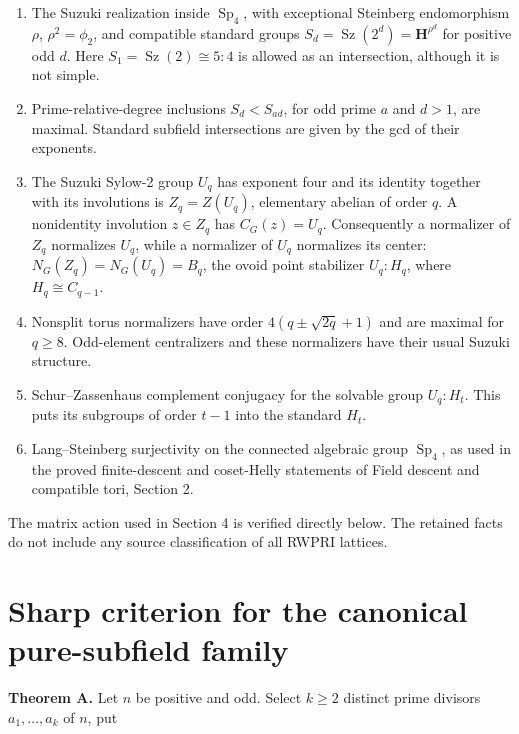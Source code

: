 \documentclass[11pt,a4paper]{article}
\providecommand{\tightlist}{\setlength{\itemsep}{0pt}\setlength{\parskip}{0pt}}
\begin{document}
\begin{enumerate}
\def\labelenumi{\arabic{enumi}.}
\tightlist
\item
  The Suzuki realization inside \(\operatorname{Sp}_4\), with
  exceptional Steinberg endomorphism \(\rho\), \(\rho^2=\phi_2\), and
  compatible standard groups
  \(S_d=\operatorname{Sz}(2^d)=\mathbf H^{\rho^d}\) for positive odd
  \(d\). Here \(S_1=\operatorname{Sz}(2)\cong5:4\) is allowed as an
  intersection, although it is not simple.
\item
  Prime-relative-degree inclusions \(S_d<S_{ad}\), for odd prime \(a\)
  and \(d>1\), are maximal. Standard subfield intersections are given by
  the gcd of their exponents.
\item
  The Suzuki Sylow-2 group \(U_q\) has exponent four and its identity
  together with its involutions is \(Z_q=Z(U_q)\), elementary abelian of
  order \(q\). A nonidentity involution \(z\in Z_q\) has \(C_G(z)=U_q\).
  Consequently a normalizer of \(Z_q\) normalizes \(U_q\), while a
  normalizer of \(U_q\) normalizes its center:
  \(N_G(Z_q)=N_G(U_q)=B_q\), the ovoid point stabilizer \(U_q:H_q\),
  where \(H_q\cong C_{q-1}\).
\item
  Nonsplit torus normalizers have order \(4(q\pm\sqrt{2q}+1)\) and are
  maximal for \(q\ge8\). Odd-element centralizers and these normalizers
  have their usual Suzuki structure.
\item
  Schur--Zassenhaus complement conjugacy for the solvable group
  \(U_q:H_t\). This puts its subgroups of order \(t-1\) into the
  standard \(H_t\).
\item
  Lang--Steinberg surjectivity on the connected algebraic group
  \(\operatorname{Sp}_4\), as used in the proved finite-descent and
  coset-Helly statements of Field descent and compatible tori, Section 2.
\end{enumerate}

The matrix action used in Section 4 is verified directly below. The
retained facts do not include any source classification of all RWPRI
lattices.

\section{Sharp criterion for the canonical pure-subfield
family}\label{sharp-criterion-for-the-canonical-pure-subfield-family}

\textbf{Theorem A.} Let \(n\) be positive and odd. Select \(k\ge2\)
distinct prime divisors \(a_1,\ldots,a_k\) of \(n\), put
\end{document}
